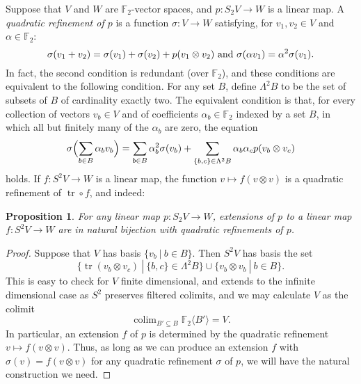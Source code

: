 \documentclass[11pt]{amsart} \renewcommand{\baselinestretch}{1.2}
\theoremstyle{plain}
\newtheorem{prop}[thm]{Proposition}
\theoremstyle{definition}
\DeclareMathOperator{\trace}{tr}
\DeclareMathOperator*{\colim}{colim}
\renewcommand{\to}{\longrightarrow}
\newcommand{\F}{\mathbb{F}}
\newcommand{\Ftwo}{\F_2}
\renewcommand{\mapsto}{\longmapsto}
\begin{document}
\begin{Conventions and notation}
Suppose that $V$ and $W$ are $\Ftwo $-vector spaces, and $p:S_2V\to W$ is a linear map. A \emph{quadratic refinement of $p$} is a function $\sigma:V\to W$ satisfying, for $v_1,v_2\in V$ and $\alpha\in\Ftwo $:
\[\sigma(v_1+v_2)=\sigma(v_1)+\sigma(v_2)+p(v_1\otimes v_2)\textup{ and }\sigma(\alpha v_1)=\alpha^2\sigma(v_1).\]
In fact, the second condition is redundant (over $\Ftwo $), and these conditions are equivalent to the following condition. For any set $B$, define $\Lambda^2B$ to be the set of subsets of $B$ of cardinality exactly two. 
The equivalent condition is that, for every collection of vectors $v_b\in V$ and of coefficients $\alpha_b\in \Ftwo $ indexed by a set $B$, in which all but finitely many of the $\alpha_b$ are zero, the equation
\[\sigma\Bigl(\sum_{b\in B}\alpha_bv_b\Bigr)=\sum_{b\in B}\alpha_b^2\sigma(v_b)+\sum_{\{b,c\}\in \Lambda^2B}\alpha_b\alpha_cp(v_b\otimes v_c)\]
holds.
%
%
%
%
%
If $f:S^2V\to W$ is a linear map, the function
$v\mapsto f(v\otimes v)$
is a quadratic refinement of $\trace\circ f$, and indeed:
\begin{prop}
\label{propOnExtendingToInvariants}
For any linear map $p:S_2V\to W$, extensions of $p$ to a linear map $f:S^2V\to W$ are in natural bijection  with quadratic refinements of $p$.
\end{prop}
\begin{proof}
Suppose that $V$ has basis $\{v_b\ |\ b\in B\}$. Then $S^2V$ has basis the set 
\[\{\trace(v_b\otimes v_c)\ |\ \{b,c\}\in\Lambda^2B\}\cup\{v_b\otimes v_b\ |\ b\in B\}.\]
This is easy to check for $V$ finite dimensional, and extends to the infinite dimensional case as $S^2$ preserves filtered colimits, and we may calculate $V$ as the colimit
\[\colim_{B'\subseteq B}\Ftwo \langle B'\rangle=V.\]
In particular, an extension $f$ of $p$ is determined by the quadratic refinement $v\mapsto f(v\otimes v)$. Thus, as long as we can produce an extension $f$ with $\sigma(v)=f(v\otimes v)$ for any quadratic refinement $\sigma$ of $p$, we will have the natural construction we need.


\end{proof}
\end{Conventions and notation}
\end{document}
